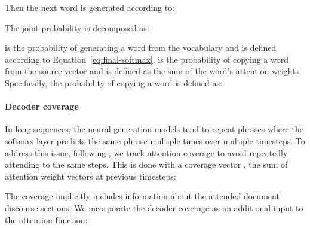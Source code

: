 \documentclass[11pt,a4paper]{article}
\begin{document}
Then the next word  is generated according to:


The joint probability is decomposed as:
\vspace{-10pt}

{\small

}

\noindent  is the probability of generating a word from the vocabulary and is defined according to Equation~\ref{eq:final-softmax}.
 is the probability of copying a word from the source vector  and is defined as the sum of the word's attention weights. Specifically, the probability of copying a word  is defined as:
{
}





\paragraph{Decoder coverage}
In long sequences, the neural generation models tend to repeat phrases where the softmax layer predicts the same phrase multiple times over multiple timesteps.
To address this issue, following , we track attention coverage to avoid repeatedly attending to the same steps. This is done with a coverage vector , the sum of attention weight vectors at previous timesteps:
{\small }

The coverage implicitly includes information about the attended document discourse sections. We incorporate the decoder coverage as an additional input to the attention function:

{\small

\vspace{-10pt}}
\normalsize
\end{document}

